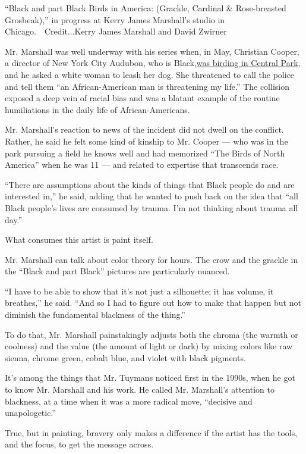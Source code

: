 ``Black and part Black Birds in America: (Grackle, Cardinal \&
Rose-breasted Grosbeak),'' in progress at Kerry James Marshall's studio
in Chicago.~~Credit...Kerry James Marshall and David Zwirner

Mr. Marshall was well underway with his series when, in May, Christian
Cooper, a director of New York City Audubon, who is
Black,\href{https://www.nytimes.com/2020/06/14/nyregion/central-park-amy-cooper-christian-racism.html}{was
birding in Central Park}, and he asked a white woman to leash her dog.
She threatened to call the police and tell them ``an African-American
man is threatening my life.'' The collision exposed a deep vein of
racial bias and was a blatant example of the routine humiliations in the
daily life of African-Americans.

Mr. Marshall's reaction to news of the incident did not dwell on the
conflict. Rather, he said he felt some kind of kinship to Mr. Cooper ---
who was in the park pursuing a field he knows well and had memorized
``The Birds of North America'' when he was 11 --- and related to
expertise that transcends race.

``There are assumptions about the kinds of things that Black people do
and are interested in,'' he said, adding that he wanted to push back on
the idea that ``all Black people's lives are consumed by trauma. I'm not
thinking about trauma all day.''

What consumes this artist is paint itself.

Mr. Marshall can talk about color theory for hours. The crow and the
grackle in the ``Black and part Black'' pictures are particularly
nuanced.

``I have to be able to show that it's not just a silhouette; it has
volume, it breathes,'' he said. ``And so I had to figure out how to make
that happen but not diminish the fundamental blackness of the thing.''

To do that, Mr. Marshall painstakingly adjusts both the chroma (the
warmth or coolness) and the value (the amount of light or dark) by
mixing colors like raw sienna, chrome green, cobalt blue, and violet
with black pigments.

It's among the things that Mr. Tuymans noticed first in the 1990s, when
he got to know Mr. Marshall and his work. He called Mr. Marshall's
attention to blackness, at a time when it was a more radical move,
``decisive and unapologetic.''

True, but in painting, bravery only makes a difference if the artist has
the tools, and the focus, to get the message across.

